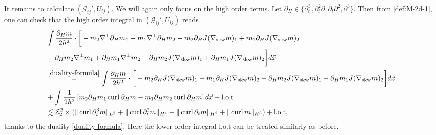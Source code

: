 \documentclass[reqno,11pt]{amsart}
\newcommand{\norm}[2]{\Vert #1 \Vert_{#2}}
\DeclareMathOperator{\curl}{curl}
\theoremstyle{plain}
\theoremstyle{definition}
\numberwithin{equation}{section}
\begin{document}

It remains to calculate $ (\mathcal G_{ij}', U_{ij}) $. We will again only focus on the high order terms. Let  $\partial_H\in \{\partial_t^3,\partial_t^2 \partial ,\partial_t\partial^2, \partial^3\}$. Then from \eqref{def:M-2d-1}, one can check that the high order integral in $ (\mathcal G_{ij}', U_{ij}) $ reads
\begin{equation}
\begin{aligned}
\label{2d-high-energy}
   & \int \frac{\partial_H m}{2h^2}\cdot \bigg[-m_2\nabla^{\perp}\partial_H m_1+m_1\nabla^{\perp} \partial_H m_2-m_2 \partial_HJ(\nabla_{\mathrm{skw}}m)_1+m_1\partial_H J(\nabla_{\mathrm{skw}}m)_2  \\
   & -\partial_H m_2 \nabla^{\perp}m_1+\partial_H m_1\nabla^{\perp}m_2-\partial_H m_2 J(\nabla_{\mathrm{skw}}m)_1+\partial_H m_1J(\nabla_{\mathrm{skw}}m)_2 \bigg]d\vec{x} \\
   & \overset{\eqref{duality-formula}}{=}\int \frac{\partial_Hm}{2h^2} \cdot \bigg[-m_2 \partial_HJ(\nabla_{\mathrm{skw}}m)_1+m_1\partial_H J(\nabla_{\mathrm{skw}}m)_2-\partial_H m_2 J(\nabla_{\mathrm{skw}}m)_1+\partial_H m_1J(\nabla_{\mathrm{skw}}m)_2 \bigg] d\vec{x} \\
   &+\int \frac{1}{2h^2} \left[ m_2\partial_H m_1\curl\partial_H m-m_1 \partial_H m_2 \curl\partial_H m \right] d\vec{x} + \mathrm{l.o.t} \\
   & \lesssim \mathcal E_2^2 \times (\norm{\curl \partial_t^3 m}{L^2}+\norm{\curl \partial_t^2 m}{H^1}+\norm{\curl \partial_t m}{H^2}+\norm{\curl m}{H^3}) + \mathrm{l.o.t},
\end{aligned}
\end{equation}
thanks to the duality \eqref{duality-formula}. 
Here the lower order integral $ \mathrm{l.o.t} $ can be treated similarly as before. 
\end{document}
